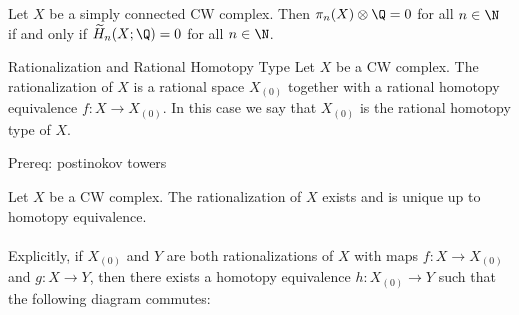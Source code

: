 \documentclass[a4paper]{article}
\begin{document}
\begin{lmm}{}{} Let $X$ be a simply connected CW complex. Then $\pi_n(X)\otimes\Q=0$ for all $n\in\N$ if and only if $\widetilde{H}_n(X;\Q)=0$ for all $n\in\N$. 
\end{lmm}

\begin{defn}{Rationalization and Rational Homotopy Type}{} Let $X$ be a CW complex. The rationalization of $X$ is a rational space $X_{(0)}$ together with a rational homotopy equivalence $f:X\to X_{(0)}$. In this case we say that $X_{(0)}$ is the rational homotopy type of $X$. 
\end{defn}

Prereq: postinokov towers

\begin{thm}{}{} Let $X$ be a CW complex. The rationalization of $X$ exists and is unique up to homotopy equivalence. \\~\\

Explicitly, if $X_{(0)}$ and $Y$ are both rationalizations of $X$ with maps $f:X\to X_{(0)}$ and $g:X\to Y$, then there exists a homotopy equivalence $h:X_{(0)}\to Y$ such that the following diagram commutes: \\~\\
\\~\\
\end{thm}
\end{document}
